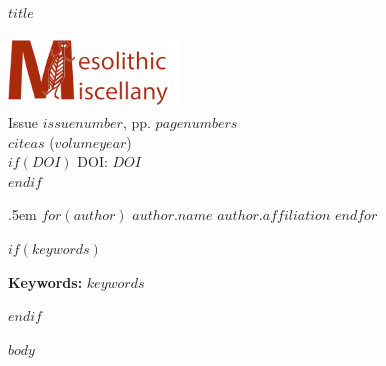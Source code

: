 \documentclass[hidelinks,12pt,a4paper]{article}
\renewcommand\UrlFont{\sf\itshape}
\newcommand{\titlesize}{\fontsize{22.0}{20pt}\selectfont}
\begin{document}
\begin{sf}
{\raggedright %
\begin{minipage}[t]{120mm}
  \vskip 2.5pt%
{\raggedright\titlesize\textbf{$title$} \par}
    \end{minipage}\hspace{7mm}\begin{minipage}[t]{40.0mm}
\hbox{}\includegraphics[height=19mm]{MM_Logo}\\
\scriptsize{Issue $issuenumber$, pp. $pagenumbers$}\\ 
\scriptsize{$citeas$ ($volumeyear$)}\\
$if(DOI)$
\scriptsize{DOI: $DOI$}\\
$endif$
\end{minipage}

{\par\large%
      \vspace*{5mm}
      \lineskip .5em%
$for(author)$
                               \textbf{$author.name$} \hskip 15pt \emph{\small $author.affiliation$}      \vskip 5pt 
 $endfor$
     \vskip 20pt%
         {\noindent\usebox\absbox\par}
         
 $if(keywords)$
    {\vspace{15pt}%
      {\noindent\normalsize \textbf{Keywords:} $keywords$ }\par}
      \vspace{6mm}
      \par%
$endif$    
 
 
 
  }}
\end{sf}


\renewcommand\UrlFont{\itshape}
 \setlength{\parindent}{0em}

 $body$
\end{document}
